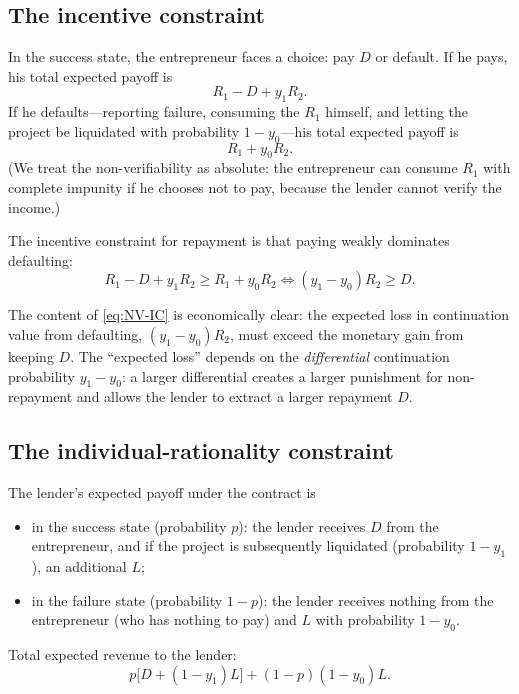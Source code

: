 \documentclass[11pt,a4paper,oneside]{book}
\def\geq{\geqslant}
\theoremstyle{plain}
\theoremstyle{definition}
\theoremstyle{remark}
\numberwithin{equation}{chapter}
\begin{document}
\subsection{The incentive constraint}

In the success state, the entrepreneur faces a choice: pay $D$ or default.
If he pays, his total expected payoff is
\begin{equation*}
  R_1 - D + y_1 R_2.
\end{equation*}
If he defaults---reporting failure, consuming the $R_1$ himself, and letting the project be liquidated with probability $1 - y_0$---his total expected payoff is
\begin{equation*}
  R_1 + y_0 R_2.
\end{equation*}
(We treat the non-verifiability as absolute: the entrepreneur can consume $R_1$ with complete impunity if he chooses not to pay, because the lender cannot verify the income.)

The incentive constraint for repayment is that paying weakly dominates defaulting:
\begin{equation}\label{eq:NV-IC}
  R_1 - D + y_1 R_2 \geq R_1 + y_0 R_2 \Longleftrightarrow (y_1 - y_0) R_2 \geq D.
  \tag{IC}
\end{equation}

The content of \eqref{eq:NV-IC} is economically clear: the expected loss in continuation value from defaulting, $(y_1 - y_0) R_2$, must exceed the monetary gain from keeping $D$.
The ``expected loss'' depends on the \emph{differential} continuation probability $y_1 - y_0$: a larger differential creates a larger punishment for non-repayment and allows the lender to extract a larger repayment $D$.

\subsection{The individual-rationality constraint}

The lender's expected payoff under the contract is
\begin{itemize}
  \item in the success state (probability $p$): the lender receives $D$ from the entrepreneur, and if the project is subsequently liquidated (probability $1 - y_1$), an additional $L$;
  \item in the failure state (probability $1 - p$): the lender receives nothing from the entrepreneur (who has nothing to pay) and $L$ with probability $1 - y_0$.
\end{itemize}
Total expected revenue to the lender:
\begin{equation}\label{eq:NV-lender-revenue}
  p \bigl[ D + (1 - y_1) L \bigr] + (1 - p)(1 - y_0) L.
\end{equation}
\end{document}
